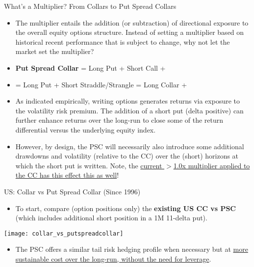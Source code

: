 \documentclass{beamer}
\begin{document}
\begin{frame}{What's a Multiplier? From Collars to Put Spread Collars}
\begin{itemize}
\item The multiplier entails the addition (or subtraction) of directional exposure to the overall equity options structure. Instead of setting a multiplier based on historical recent performance that is subject to change, why not let the market set the multiplier?
\vfill
\item {\bf Put Spread Collar} = Long Put + Short Call + {\color{blue}{\em Short Put}}
\item[] = Long Put + Short Straddle/Strangle = Long Collar + {\color{blue}{\em Short Put}}
\vfill
\item As indicated empirically, writing options generates returns via exposure to the volatility risk premium. The addition of a short put (delta positive) can further enhance returns over the long-run to close some of the return differential versus the underlying equity index. 
\vfill
\item However, by design, the PSC will necessarily also introduce some additional drawdowns and volatility (relative to the CC) over the (short) horizons at which the short put is written. Note, the \underline {current $>$1.0x multiplier applied to the CC has this effect this as well}!
\end{itemize}

\end{frame}

\begin{frame}{US: Collar vs Put Spread Collar (Since 1996)}
\begin{itemize}
\item To start, compare (option positions only) the {\bf existing US CC vs PSC} (which includes additional short position in a 1M 11-delta put).
\end{itemize}


\texttt{[image: collar\_vs\_putspreadcollar]}

\begin{itemize}
\item The PSC offers a similar tail risk hedging profile when necessary but at \underline{more sustainable cost over the long-run, without the need for leverage}.
\end{itemize}

\end{frame}
\end{document}
